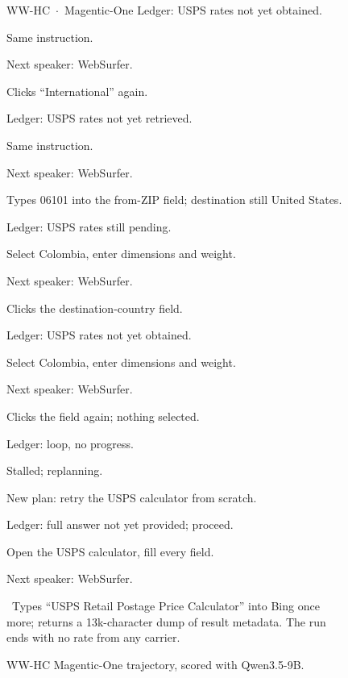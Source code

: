 \begin{figure}[p]
\begin{minipage}{\textwidth}
\begin{qbox}{\textsc{WW-HC} \,$\cdot$\, Magentic-One}
Ledger: USPS rates not yet obtained.

Same instruction.

Next speaker: WebSurfer.

Clicks ``International'' again.

Ledger: USPS rates not yet retrieved.

Same instruction.

Next speaker: WebSurfer.

Types 06101 into the from-ZIP field; destination still United States.

Ledger: USPS rates still pending.

Select Colombia, enter dimensions and weight.

Next speaker: WebSurfer.

Clicks the destination-country field.

Ledger: USPS rates not yet obtained.

Select Colombia, enter dimensions and weight.

Next speaker: WebSurfer.

Clicks the field again; nothing selected.

Ledger: loop, no progress.

Stalled; replanning.

New plan: retry the USPS calculator from scratch.

Ledger: full answer not yet provided; proceed.

Open the USPS calculator, fill every field.

Next speaker: WebSurfer.

\qbase\
Types ``USPS Retail Postage Price Calculator'' into Bing once more; returns a
13k-character dump of result metadata. The run ends with no rate from any carrier.
\end{qbox}
\end{minipage}
\caption{\textsc{WW-HC} Magentic-One trajectory, scored with Qwen3.5-9B.}
\label{fig:qual-text-2}
\end{figure}
